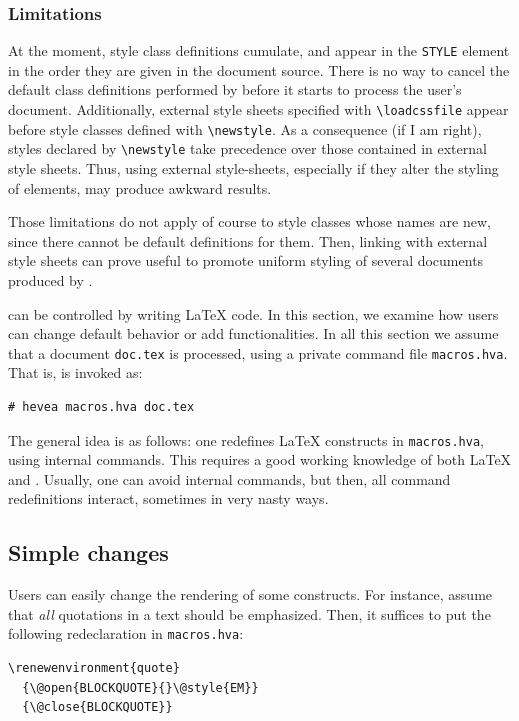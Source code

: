 \subsubsection{Limitations}
At the moment, style class definitions cumulate, and appear
in the \verb+STYLE+ element in the order they are given in the
document source. There is no way to cancel the default class
definitions performed by \hevea{} before it starts to process the
user's document.
Additionally, external style sheets specified with \verb+\loadcssfile+
appear before style classes defined with \verb+\newstyle+.
As a consequence (if I am right), styles
declared by \verb+\newstyle+ take precedence over those contained in
external style sheets. Thus, using external style-sheets, especially
if they alter the styling of elements, may produce awkward results.

Those limitations do not apply of course to style classes whose
names are new, since there cannot be default definitions for them.
Then, linking with external style sheets can prove useful to
promote uniform styling of several documents produced by \hevea{}.


\hevea{} can be controlled by writing \LaTeX{} code. In this section,
we examine how users can change \hevea{} default behavior or add
functionalities. In all this section we assume that a document
\texttt{doc.tex} is processed, using a private command file
\texttt{macros.hva}. That is, \hevea{} is invoked as:
\begin{verbatim}
# hevea macros.hva doc.tex
\end{verbatim}
The general idea is as follows: one redefines \LaTeX{} constructs in
\texttt{macros.hva}, using internal commands. This requires a good
working knowledge of both \LaTeX{} and \html.
Usually, one can avoid internal commands, but then, all command
redefinitions interact, sometimes in very nasty ways.


\subsection{Simple changes}
Users can easily change the rendering of some constructs. For
instance, assume that \emph{all} quotations in a text should be
emphasized. Then, it suffices to put the following redeclaration in
\texttt{macros.hva}:
\begin{verbatim}
\renewenvironment{quote}
  {\@open{BLOCKQUOTE}{}\@style{EM}}
  {\@close{BLOCKQUOTE}}
\end{verbatim}

